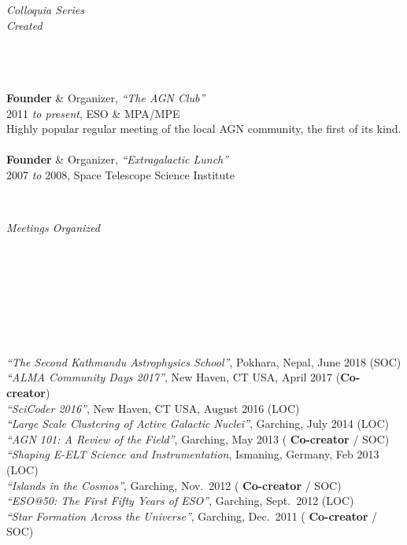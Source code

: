 \documentclass[11pt]{article}
\begin{document}
\vspace{4mm}

\hspace{2.5mm} \parbox{1.5in}{\textit{Colloquia Series \\ Created\\\\\\\\} } \parbox{5.15in}{
\textbf{Founder} \& Organizer, \textit{``The AGN Club''}  \\ 2011 \textit{to present},  ESO \& MPA/MPE \\ Highly popular regular meeting of the local AGN community, the first of its kind. \\\\
\textbf{Founder} \& Organizer, \textit{``Extragalactic Lunch''} \\
2007 \textit{to} 2008, Space Telescope Science Institute} \\


\vspace{4mm}



\hspace{2.5mm} \parbox{1.5in}{\textit{Meetings Organized} \\\\\\\\\\\\\\\\} \parbox{5.15in}{
\textit{``The Second Kathmandu Astrophysics School''}, Pokhara, Nepal, June 2018 (SOC) \\
\textit{``ALMA Community Days 2017''}, New Haven, CT USA, April 2017 (\textbf{Co-creator}) \\
\textit{``SciCoder 2016''}, New Haven, CT USA, August 2016 (LOC)\\
\textit{``Large Scale Clustering of Active Galactic Nuclei''}, Garching, July 2014 (LOC)\\
\textit{``AGN 101: A Review of the Field''}, Garching, May 2013 (\textbf{ Co-creator} / SOC)\\
\textit{``Shaping E-ELT Science and Instrumentation}, Ismaning, Germany, Feb 2013 (LOC)\\
\textit{``Islands in the Cosmos''}, Garching, Nov.~2012 (\textbf{ Co-creator} / SOC)\\
\textit{``ESO@50: The First Fifty Years of ESO''}, Garching, Sept.~2012  (LOC)\\
\textit{``Star Formation Across the Universe''}, Garching, Dec.~2011 (\textbf{ Co-creator} / SOC)
}
\end{document}
